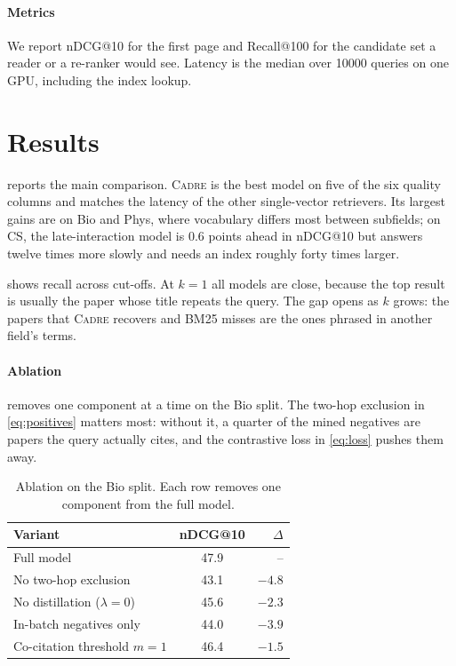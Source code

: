 \documentclass[10pt, twoside]{article}
\begin{document}
\paragraph{Metrics}
We report nDCG@10 for the first page and Recall@100 for the candidate set a
reader or a re-ranker would see. Latency is the median over \num{10000}
queries on one GPU, including the index lookup.


\section{Results}
\label{sec:results}

 reports the main comparison. \textsc{Cadre} is the best model
on five of the six quality columns and matches the latency of the other
single-vector retrievers. Its largest gains are on Bio and Phys, where
vocabulary differs most between subfields; on CS, the late-interaction model
is 0.6 points ahead in nDCG@10 but answers twelve times more slowly and needs
an index roughly forty times larger.

 shows recall across cut-offs. At $k = 1$ all models are
close, because the top result is usually the paper whose title repeats the
query. The gap opens as $k$ grows: the papers that \textsc{Cadre} recovers and
BM25 misses are the ones phrased in another field's terms.

\paragraph{Ablation}
 removes one component at a time on the Bio split. The
two-hop exclusion in \cref{eq:positives} matters most: without it, a quarter
of the mined negatives are papers the query actually cites, and the
contrastive loss in \cref{eq:loss} pushes them away.

\begin{table}[t]
  \centering
  \caption{Ablation on the Bio split. Each row removes one component from the
  full model.}
  \label{tab:ablation}
  \small
  \begin{tabular}{@{}l S[table-format=2.1] r@{}}
    \toprule
    Variant & {nDCG@10} & $\Delta$ \\
    \midrule
    Full model                     & 47.9 & -- \\
    No two-hop exclusion           & 43.1 & $-4.8$ \\
    No distillation ($\lambda = 0$) & 45.6 & $-2.3$ \\
    In-batch negatives only        & 44.0 & $-3.9$ \\
    Co-citation threshold $m = 1$  & 46.4 & $-1.5$ \\
    \bottomrule
  \end{tabular}
\end{table}
\end{document}
